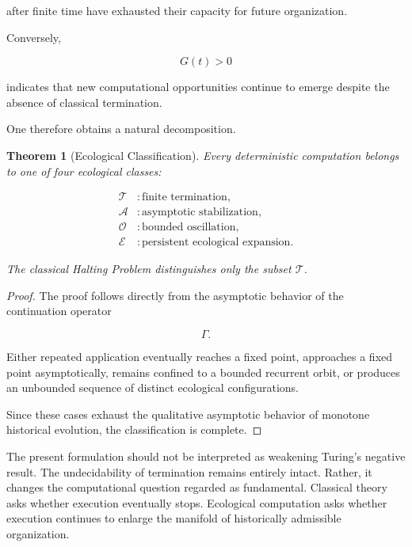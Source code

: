 \documentclass[12pt,oneside]{article}
\newtheorem{theorem}[definition]{Theorem}
\theoremstyle{remark}
\begin{document}
after finite time have exhausted their capacity for future organization.

Conversely,

\[
G(t)
>
0
\]

indicates that new computational opportunities continue to emerge despite the
absence of classical termination.

One therefore obtains a natural decomposition.

\begin{theorem}[Ecological Classification]

Every deterministic computation belongs to one of four ecological classes:

\[
\begin{aligned}
\mathcal T &: \text{finite termination},\\
\mathcal A &: \text{asymptotic stabilization},\\
\mathcal O &: \text{bounded oscillation},\\
\mathcal E &: \text{persistent ecological expansion}.
\end{aligned}
\]

The classical Halting Problem distinguishes only the subset
\(\mathcal T\).

\end{theorem}

\begin{proof}

The proof follows directly from the asymptotic behavior of the continuation
operator

\[
\Gamma.
\]

Either repeated application eventually reaches a fixed point, approaches a
fixed point asymptotically, remains confined to a bounded recurrent orbit, or
produces an unbounded sequence of distinct ecological configurations.

Since these cases exhaust the qualitative asymptotic behavior of monotone
historical evolution, the classification is complete.

\end{proof}

The present formulation should not be interpreted as weakening Turing's
negative result. The undecidability of termination remains entirely intact.
Rather, it changes the computational question regarded as fundamental. Classical
theory asks whether execution eventually stops. Ecological computation asks
whether execution continues to enlarge the manifold of historically admissible
organization.
\end{document}
